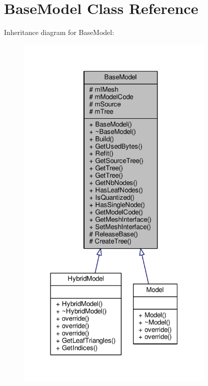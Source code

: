 \hypertarget{classBaseModel}{}\section{Base\+Model Class Reference}
\label{classBaseModel}


Inheritance diagram for Base\+Model\+:
\nopagebreak
\begin{figure}[H]
\begin{center}
\leavevmode
\includegraphics[width=270pt]{dd/d1e/classBaseModel__inherit__graph}
\end{center}
\end{figure}


